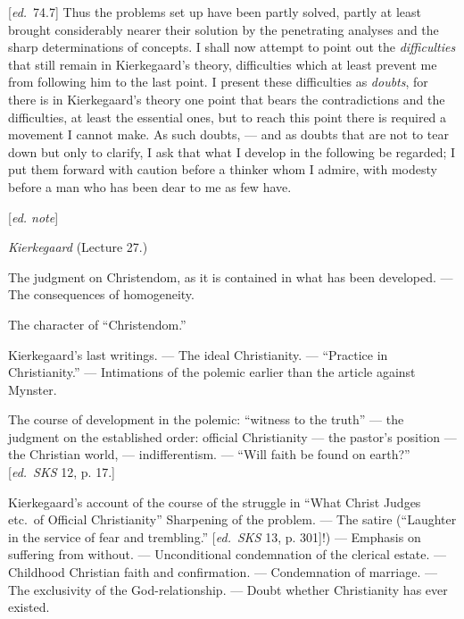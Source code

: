 \documentclass[12pt,a4paper,openany]{book}
\newcommand{\kpage}[1]{\marginnote{\footnotesize\textit{[#1]}}}
\newcommand{\ed}[1]{{\small[\textit{ed.}\ #1]}}
\newcommand{\ednote}[1]{{\small[\textit{ed. note}]}}
\begin{document}
\ed{74.7} Thus the problems set up have been partly solved, partly
at least brought considerably nearer their solution by the penetrating
analyses and the sharp determinations of concepts. I shall now
attempt to point out the \emph{difficulties} that still remain in
Kierkegaard's theory, difficulties which at least prevent
me from following him to the last point. I present these
difficulties as \emph{doubts}, for there is in Kierkegaard's theory
one point that bears the contradictions and the difficulties, at least
the essential ones, but to reach this point there is required
\kpage{166}a movement I cannot make. As such doubts, --- and as
doubts that are not to tear down but only to clarify, I ask that what
I develop in the following be regarded; I put them forward with
caution before a thinker whom I admire, with modesty
before a man who has been dear to me as few have.

\ednote{}

\emph{Kierkegaard} (Lecture 27.)

The judgment on Christendom, as it is contained in what has been
developed. --- The consequences of homogeneity.

The character of ``Christendom.''

Kierkegaard's last writings. --- The ideal Christianity. --- ``Practice
in Christianity.'' --- Intimations of the polemic earlier than
the article against Mynster.

The course of development in the polemic: ``witness to the truth'' --- the judgment on
the established order: official Christianity --- the pastor's position ---
the Christian world, --- indifferentism. --- ``Will faith be found on
earth?'' \ed{\emph{SKS} 12, p. 17.}

Kierkegaard's account of the course of the struggle in ``What Christ
Judges etc.\ of Official Christianity'' Sharpening of the problem.
--- The satire (``Laughter in the service of fear and trembling.'' \ed{\emph{SKS} 13, p. 301}!)
--- Emphasis on suffering from without. --- Unconditional condemnation of
the clerical estate. --- Childhood Christian faith and confirmation. --- Condemnation
of marriage. --- The exclusivity of the God-relationship. --- Doubt
whether Christianity has ever existed.
\end{document}
